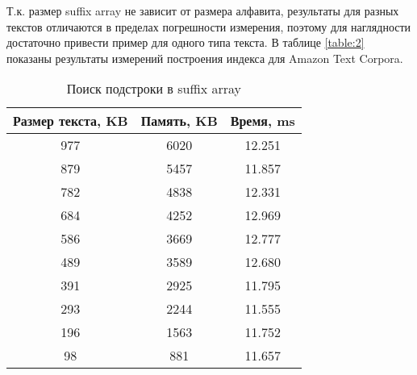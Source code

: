 Т.к. размер suffix array не зависит от размера алфавита,
результаты для разных текстов отличаются в пределах погрешности измерения,
поэтому для наглядности достаточно привести пример для одного типа текста.
В таблице \ref{table:2} показаны результаты измерений построения индекса для Amazon Text Corpora.


\begin{table}[h!]
    \centering
    \begin{tabular}{|c|c|c|}
        \hline
        Размер текста, KB & Память, KB & Время, ms\\
        \hline
        977 & 6020 & 12.251\\
        \hline
        879 & 5457 & 11.857\\
        \hline
        782 & 4838 & 12.331\\
        \hline
        684 & 4252 & 12.969\\
        \hline
        586 & 3669 & 12.777\\
        \hline
        489 & 3589 & 12.680\\
        \hline
        391 & 2925 & 11.795\\
        \hline
        293 & 2244 & 11.555\\
        \hline
        196 & 1563 & 11.752\\
        \hline
        98 & 881 & 11.657\\
        \hline
    \end{tabular}
    \caption{Поиск подстроки в suffix array}
    \label{table:3}
\end{table}
